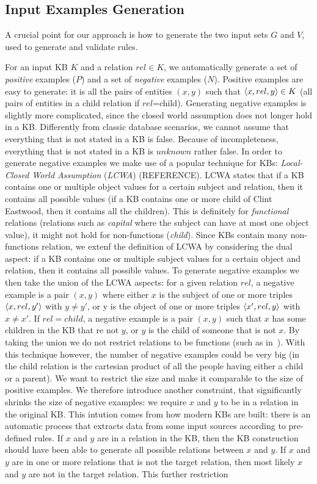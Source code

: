 \subsection{Input Examples Generation} \label{sec:examples_gen}
A crucial point for our approach is how to generate the two input sets $G$ and $V$, used to generate and validate rules. 

For an input KB $K$ and a relation $rel \in K$, we automatically generate a set of \emph{positive} examples ($P$) and a set of \emph{negative} examples ($N$). Positive examples are easy to generate: it is all the pairs of entities $(x,y)$ such that $\langle x,rel,y\rangle \in K$ (all pairs of entities in a child relation if $rel$=child). Generating negative examples is slightly more complicated, since the closed world assumption does not longer hold in a KB. Differently from classic database scenarios, we cannot assume that everything that is not stated in a KB is false. Because of incompleteness, everything that is not stated in a KB is $unknown$ rather false. In order to generate negative examples we make use of a popular technique for KBs: \emph{Local-Closed World Assumption} (\emph{LCWA}) (REFERENCE). LCWA states that if a KB contains one or multiple object values for a certain subject and relation, then it contains all possible values (if a KB contains one or more child of Clint Eastwood, then it contains all the children). This is definitely for \emph{functional} relations (relations such as \emph{capital} where the subject can have at most one object value), it might not hold for non-functions (\emph{child}). Since KBs contain many non-functions relation, we extenf the definition of LCWA by considering the dual aspect: if a KB contains one or multiple subject values for a certain object and relation, then it contains all possible values. To generate negative examples we then take the union of the LCWA aspects: for a given relation $rel$, a negative example is a pair $(x,y)$ where either $x$ is the subject of one or more triples $\langle x,rel,y'\rangle$ with $y \neq y'$, or y is the object of one or more triples $\langle x',rel,y\rangle$ with $x \neq x'$. If $rel=child$, a negative example is a pair $(x,y)$ such that $x$ has some children in the KB that re not $y$, or $y$ is the child of someone that is not $x$. By taking the union we do not restrict relations to be functions (such as in~\cite{galarraga2015fast}). With this technique however, the number of negative examples could be very big (in the child relation is the cartesian product of all the people having either a child or a parent). We want to restrict the size and make it comparable to the size of positive examples. We therefore introduce another constraint, that significantly shrinks the size of negative examples: we require $x$ and $y$ to be in a relation in the original KB. This intution comes from how modern KBs are built: there is an automatic process that extracts data from some input sources according to pre-defined rules. If $x$ and $y$ are in a relation in the KB, then the KB construction should have been able to generate all possible relations between $x$ and $y$. If $x$ and $y$ are in one or more relations that is not the target relation, then most likely $x$ and $y$ are not in the target relation. This further restriction 
